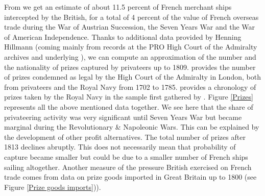 \documentclass[12pt,a4paper,notitlepage,english]{article}
\begin{document}
From \cite{Hillmann2011} we get an estimate of about 11.5 percent of French merchant ships intercepted by the British, for a total of 4 percent of the value of French overseas trade during the War of Austrian Succession, the Seven Years War and the War of American Independence. Thanks to additional data provided by Henning Hillmann (coming mainly from records at the PRO High Court of the Admiralty archives and underlying \cite{Hillmann2011}), we can compute an approximation of the number and the nationality of prizes captured by privateers up to 1809. 
\cite{Starkey1990} provides the number of prizes condemned as legal by the High Court of the Admiralty in London, both from privateers and the Royal Navy from 1702 to 1785. 
\cite{Benjamin2009} provides a chronology of prizes taken by the Royal Navy in the sample first gathered by \cite{Hill1998}.
Figure \ref{Prizes} represents all the above mentioned data together. We see here that the share of privateering activity was very significant until Seven Years War but became marginal during the Revolutionary \& Napoleonic Wars. This can be explained by the development of other profit alternatives.  
The total number of prizes after 1813 declines abruptly. This does not necessarily mean that probability of capture became smaller but could be due to a smaller number of French ships sailing altogether.
Another measure of the pressure British exercised on French trade comes from data on prize goods imported in Great Britain up to 1800 (see Figure \ref{Prize goods imports})).
\end{document}
